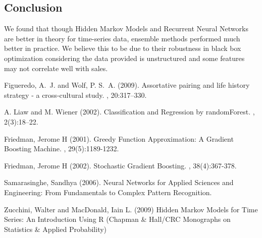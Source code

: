 \documentclass[twoside]{article}
\begin{document}
\begin{multicols}{2}
\section{Conclusion}

\indent \indent We found that though Hidden Markov Models and Recurrent Neural Networks are better in theory for time-series data, ensemble methods performed much better in practice. We believe this to be due to their robustness in black box optimization considering the data provided is unstructured and some features may not correlate well with sales.



\begin{thebibliography}{99} 

Figueredo, A.~J. and Wolf, P. S.~A. (2009).
\newblock Assortative pairing and life history strategy - a cross-cultural
  study.
, 20:317--330.


A. Liaw and M. Wiener (2002). 
\newblock Classification and Regression by randomForest.  
, 2(3):18--22.

 Friedman, Jerome H (2001).
 \newblock Greedy Function Approximation: A Gradient Boosting Machine.
 , 29(5):1189-1232.
 
 Friedman, Jerome H (2002).
 \newblock Stochastic Gradient Boosting.
 , 38(4):367-378.
 
 Samarasinghe, Sandhya (2006).
 \newblock Neural Networks for Applied Sciences and Engineering: From Fundamentals to Complex Pattern Recognition.
 
 Zucchini, Walter and MacDonald, Iain L. (2009)
 \newblock Hidden Markov Models for Time Series: An Introduction Using R (Chapman \& Hall/CRC Monographs on Statistics \& Applied Probability)

 
\end{thebibliography}


\end{multicols}
\end{document}
